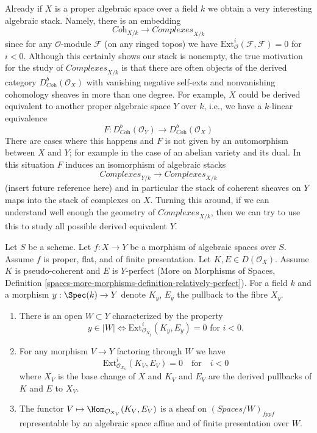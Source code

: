 \medskip\noindent
Already if $X$ is a proper algebraic
space over a field $k$ we obtain a very interesting algebraic stack.
Namely, there is an embedding
$$
\textit{Coh}_{X/k} \longrightarrow \textit{Complexes}_{X/k}
$$
since for any $\mathcal{O}$-module $\mathcal{F}$ (on any ringed topos)
we have $\text{Ext}^i_\mathcal{O}(\mathcal{F}, \mathcal{F}) = 0$ for $i < 0$.
Although this certainly shows our stack is nonempty, the
true motivation for the study of $\textit{Complexes}_{X/k}$
is that there are often objects of the derived category
$D^b_{\textit{Coh}}(\mathcal{O}_X)$ with vanishing negative self-exts
and nonvanishing cohomology sheaves in more than one degree.
For example, $X$ could be derived equivalent to another
proper algebraic space $Y$ over $k$, i.e., we have a
$k$-linear equivalence
$$
F : D^b_{\textit{Coh}}(\mathcal{O}_Y)
\longrightarrow
D^b_{\textit{Coh}}(\mathcal{O}_X)
$$
There are cases where this happens and $F$ is not given by
an automorphism between $X$ and $Y$; for example in the case
of an abelian variety and its dual. In this situation $F$ induces
an isomorphism of algebraic stacks
$$
\textit{Complexes}_{Y/k}
\longrightarrow
\textit{Complexes}_{X/k}
$$
(insert future reference here) and in particular the stack of coherent sheaves
on $Y$ maps into the stack of complexes on $X$. Turning this around,
if we can understand well enough the geometry of
$\textit{Complexes}_{X/k}$, then we can try to use this to study all possible
derived equivalent $Y$.

\begin{lemma}
\label{lemma-complexes-open-neg-exts-vanishing}
Let $S$ be a scheme.
Let $f : X \to Y$ be a morphism of algebraic spaces over $S$.
Assume $f$ is proper, flat, and of finite presentation.
Let $K, E \in D(\mathcal{O}_X)$. Assume $K$ is pseudo-coherent
and $E$ is $Y$-perfect (More on Morphisms of Spaces, Definition
\ref{spaces-more-morphisms-definition-relatively-perfect}).
For a field $k$ and a morphism $y : \Spec(k) \to Y$ denote $K_y$, $E_y$
the pullback to the fibre $X_y$.
\begin{enumerate}
\item There is an open $W \subset Y$ characterized by the property
$$
y \in |W|
\Leftrightarrow
\text{Ext}^i_{\mathcal{O}_{X_y}}(K_y, E_y) = 0
\text{ for }i < 0.
$$
\item For any morphism $V \to Y$ factoring through $W$ we have
$$
\text{Ext}^i_{\mathcal{O}_{X_V}}(K_V, E_V) = 0
\quad\text{for}\quad i < 0
$$
where $X_V$ is the base change of $X$ and $K_V$ and $E_V$
are the derived pullbacks of $K$ and $E$ to $X_V$.
\item The functor $V \mapsto \Hom_{\mathcal{O}_{X_V}}(K_V, E_V)$
is a sheaf on $(\textit{Spaces}/W)_{fppf}$ representable by an
algebraic space affine and of finite presentation over $W$.
\end{enumerate}
\end{lemma}

